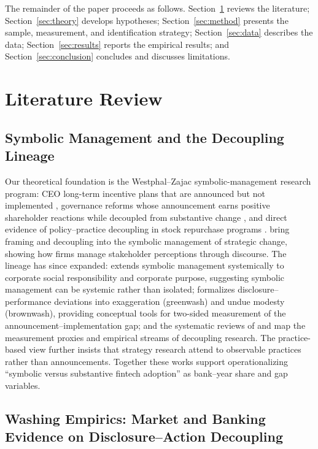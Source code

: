 The remainder of the paper proceeds as follows. Section~\ref{sec:lit} reviews
the literature; Section~\ref{sec:theory} develops hypotheses;
Section~\ref{sec:method} presents the sample, measurement, and identification
strategy; Section~\ref{sec:data} describes the data;
Section~\ref{sec:results} reports the empirical results; and
Section~\ref{sec:conclusion} concludes and discusses limitations.

\section{Literature Review}\label{sec:lit}

\subsection{Symbolic Management and the Decoupling Lineage}

Our theoretical foundation is the Westphal--Zajac symbolic-management research
program: CEO long-term incentive plans that are announced but not implemented
\parencite{westphal1994substance}, governance reforms whose announcement earns
positive shareholder reactions while decoupled from substantive change
\parencite{westphal1998sym}, and direct evidence of policy--practice
decoupling in stock repurchase programs \parencite{westphal2001decoupling}.
\textcite{fisszajac2006symbolic} bring framing and decoupling into the
symbolic management of strategic change, showing how firms manage stakeholder
perceptions through discourse. The lineage has since expanded:
\textcite{westphal2023systemic} extends symbolic management systemically to
corporate social responsibility and corporate purpose, suggesting symbolic
management can be systemic rather than isolated;
\textcite{kimlyon2015greenwash} formalizes disclosure--performance deviations
into exaggeration (greenwash) and undue modesty (brownwash), providing
conceptual tools for two-sided measurement of the
announcement--implementation gap; and the systematic reviews of
\textcite{velte2023decoupling} and \textcite{cepeda2025decoupling} map the
measurement proxies and empirical streams of decoupling research. The
practice-based view \parencite{bromiley2014practice} further insists that
strategy research attend to observable practices rather than announcements.
Together these works support operationalizing ``symbolic versus substantive
fintech adoption'' as bank--year share and gap variables.

\subsection{Washing Empirics: Market and Banking Evidence on Disclosure--Action Decoupling}

